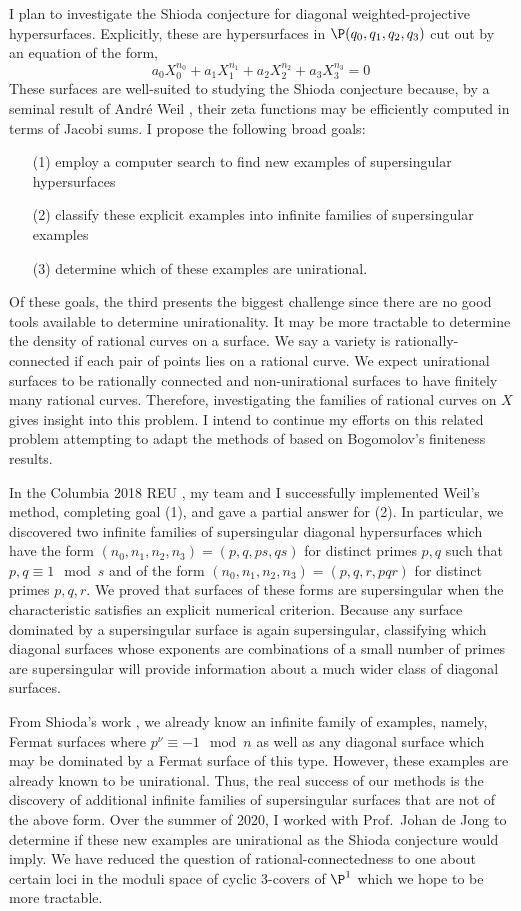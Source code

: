 \documentclass[10pt]{amsart}
\begin{document}
I plan to investigate the Shioda conjecture for diagonal weighted-projective hypersurfaces. Explicitly, these are hypersurfaces in $\P(q_0, q_1, q_2, q_3)$ cut out by an equation of the form,
\[ a_0 X_0^{n_0} + a_1 X_1^{n_1} + a_2 X_2^{n_2} + a_3 X_3^{n_3} = 0 \]
These surfaces are well-suited to studying the Shioda conjecture because, by a seminal result of Andr\'{e} Weil \cite{weil_counting}, their zeta functions may be efficiently computed in terms of Jacobi sums. I propose the following broad goals:
\begin{enumerate}
\item[(1)] employ a computer search to find new examples of supersingular hypersurfaces
\item[(2)] classify these explicit examples into infinite families of supersingular examples
\item[(3)] determine which of these examples are unirational.
\end{enumerate}
Of these goals, the third presents the biggest challenge since there are no good tools available to determine unirationality. It may be more tractable to determine the density of rational curves on a surface. We say a variety is rationally-connected if each pair of points lies on a rational curve. We expect unirational surfaces to be rationally connected and non-unirational surfaces to have finitely many rational curves. Therefore, investigating the families of rational curves on $X$ gives insight into this problem. I intend to continue my efforts on this related problem attempting to adapt the methods of \cite{lang} based on Bogomolov's finiteness results.
\par
In the Columbia 2018 REU \cite{REU}, my team and I successfully implemented Weil's method, completing goal (1), and gave a partial answer for (2). In particular, we discovered two infinite families of supersingular diagonal hypersurfaces which have the form $(n_0, n_1, n_2, n_3) = (p, q, ps, qs)$ for distinct primes $p,q$ such that $p,q \equiv 1 \mod s$ and of the form $(n_0, n_1, n_2, n_3) = (p, q, r, pqr)$ for distinct primes $p, q, r$. We proved that surfaces of these forms are supersingular when the characteristic satisfies an explicit numerical criterion. Because any surface dominated by a supersingular surface is again supersingular, classifying which diagonal surfaces whose exponents are combinations of a small number of primes are supersingular will provide information about a much wider class of diagonal surfaces.  
\par
From Shioda's work \cite{shioda_on_fermat}, we already know an infinite family of examples, namely, Fermat surfaces where $p^\nu \equiv - 1 \mod n$ as well as any diagonal surface which may be dominated by a Fermat surface of this type. However, these examples are already known to be unirational. Thus, the real success of our methods is the discovery of additional infinite families of supersingular surfaces that are not of the above form. Over the summer of 2020, I worked with Prof.\ Johan de Jong to determine if these new examples are unirational as the Shioda conjecture would imply. We have reduced the question of rational-connectedness to one about certain loci in the moduli space of cyclic $3$-covers of $\P^1$ which we hope to be more tractable. 




\end{document}
